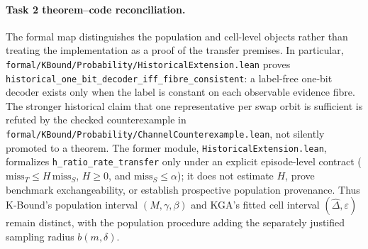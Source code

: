 \paragraph{Task 2 theorem--code reconciliation.}
The formal map distinguishes the population and cell-level objects rather than treating
the implementation as a proof of the transfer premises. In particular,
\texttt{formal/}\allowbreak\texttt{KBound/}\allowbreak\texttt{Probability/}\allowbreak\texttt{HistoricalExtension.lean} proves
\texttt{historical\_}\allowbreak\texttt{one\_bit\_}\allowbreak\texttt{decoder\_}\allowbreak\texttt{iff\_}\allowbreak\texttt{fibre\_}\allowbreak\texttt{consistent}: a label-free one-bit
decoder exists only when the label is constant on each observable evidence fibre. The
stronger historical claim that one representative per swap orbit is sufficient is
refuted by the checked counterexample in
\texttt{formal/}\allowbreak\texttt{KBound/}\allowbreak\texttt{Probability/}\allowbreak\texttt{ChannelCounterexample.lean},
not silently promoted to a theorem. The former module, \texttt{HistoricalExtension.lean}, formalizes
\texttt{h\_ratio\_rate\_transfer} only under an explicit episode-level contract
($\mathrm{miss}_{T}\le H\,\mathrm{miss}_{S}$, $H\ge0$, and
$\mathrm{miss}_{S}\le\alpha$); it does not estimate $H$, prove benchmark
exchangeability, or establish prospective population provenance. Thus K-Bound's
population interval $(M,\gamma,\beta)$ and KGA's fitted cell interval
$(\widehat\Delta,\varepsilon)$ remain distinct, with the population procedure adding
the separately justified sampling radius $b(m,\delta)$.

